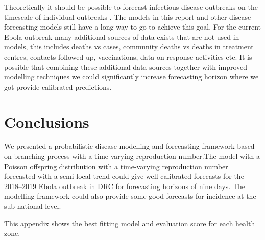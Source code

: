 \documentclass[12pt]{article}
\begin{document}
Theoretically it should be possible to forecast infectious disease outbreaks on the timescale of individual outbreaks \cite{scarpinoPredictabilityInfectiousDisease2019}. The models in this report and other disease forecasting models still have a long way to go to achieve this goal. For the current Ebola outbreak many additional sources of data exists that are not used in models, this includes deaths vs cases, community deaths vs deaths in treatment centres, contacts followed-up, vaccinations, data on response activities etc. It is possible that combining these additional data sources together with improved modelling techniques we could significantly increase forecasting horizon where we got provide calibrated predictions. 












\section{Conclusions}
We presented a probabilistic disease modelling and forecasting framework based on branching process with a time varying reproduction number.The model with a Poisson offspring distribution with a time-varying reproduction number forecasted with a semi-local trend could give well calibrated forecasts for the 2018--2019 Ebola outbreak in DRC for forecasting horizons of nine days. The modelling framework could also provide some good forecasts for incidence at the sub-national level.


\newpage

 


\clearpage
\newpage

\appendix
\appendixpage
\addappheadtotoc
{}
This appendix shows the best fitting model and evaluation score for each health zone.


\end{document}
